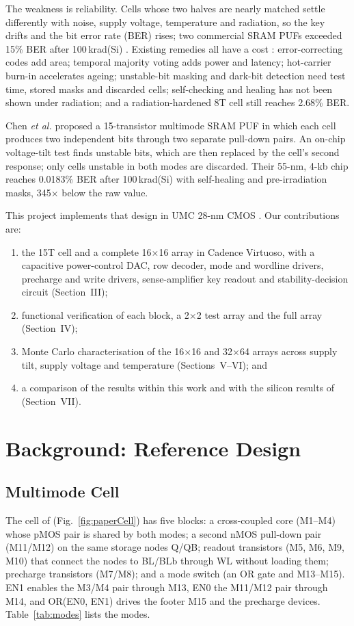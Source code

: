 \documentclass[journal]{IEEEtran}
\begin{document}
The weakness is reliability. Cells whose two halves are nearly matched settle differently with noise, supply voltage, temperature and radiation, so the key drifts and the bit error rate (BER) rises; two commercial SRAM PUFs exceeded 15\% BER after 100\,krad(Si) \cite{chen2024}. Existing remedies all have a cost \cite{chen2024,phase0}: error-correcting codes add area; temporal majority voting adds power and latency; hot-carrier burn-in accelerates ageing; unstable-bit masking \cite{liu2020} and dark-bit detection \cite{shifman2018} need test time, stored masks and discarded cells; self-checking and healing \cite{he2023} has not been shown under radiation; and a radiation-hardened 8T cell still reaches 2.68\% BER.

Chen \emph{et al.} \cite{chen2024} proposed a 15-transistor multimode SRAM PUF in which each cell produces two independent bits through two separate pull-down pairs. An on-chip voltage-tilt test finds unstable bits, which are then replaced by the cell's second response; only cells unstable in both modes are discarded. Their 55-nm, 4-kb chip reaches 0.0183\% BER after 100\,krad(Si) with self-healing and pre-irradiation masks, 345$\times$ below the raw value.

This project implements that design in UMC 28-nm CMOS \cite{phase2}. Our contributions are:
\begin{enumerate}
\item the 15T cell and a complete 16$\times$16 array in Cadence Virtuoso, with a capacitive power-control DAC, row decoder, mode and wordline drivers, precharge and write drivers, sense-amplifier key readout and stability-decision circuit (Section~III);
\item functional verification of each block, a 2$\times$2 test array and the full array (Section~IV);
\item Monte Carlo characterisation of the 16$\times$16 and 32$\times$64 arrays across supply tilt, supply voltage and temperature (Sections~V--VI); and
\item a comparison of the results within this work and with the silicon results of \cite{chen2024} (Section~VII).
\end{enumerate}

\section{Background: Reference Design}
\subsection{Multimode Cell}
The cell of \cite{chen2024} (Fig.~\ref{fig:paperCell}) has five blocks: a cross-coupled core (M1--M4) whose pMOS pair is shared by both modes; a second nMOS pull-down pair (M11/M12) on the same storage nodes Q/QB; readout transistors (M5, M6, M9, M10) that connect the nodes to BL/BLb through WL without loading them; precharge transistors (M7/M8); and a mode switch (an OR gate and M13--M15). EN1 enables the M3/M4 pair through M13, EN0 the M11/M12 pair through M14, and OR(EN0, EN1) drives the footer M15 and the precharge devices. Table~\ref{tab:modes} lists the modes.
\end{document}
